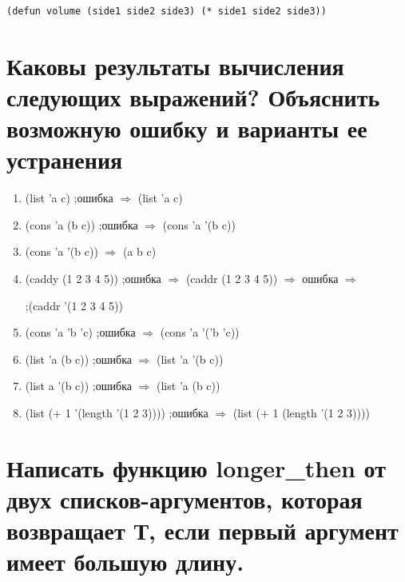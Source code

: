 \begin{lstlisting}[label=lst:task_3, caption=Задание 3.]
	(defun volume (side1 side2 side3) (* side1 side2 side3))
\end{lstlisting}

\begin{figure}[H]
\end{figure}

\section{Каковы результаты вычисления следующих выражений? Объяснить возможную ошибку и варианты ее устранения}
\begin{enumerate}
	\item (list 'a c)  ;ошибка $\Rightarrow$ (list 'a c)
	\item (cons 'a (b c)) ;ошибка $\Rightarrow$ (cons 'a '(b c))
	\item (cons 'a '(b c)) $\Rightarrow$ (a b c)
	\item (caddy (1 2 3 4 5)) ;ошибка $\Rightarrow$ (caddr (1 2 3 4 5)) $\Rightarrow$ ошибка $\Rightarrow$ 
	
	\hspace{4.5cm};(caddr '(1 2 3 4 5))
	\item (cons 'a 'b 'c)  ;ошибка $\Rightarrow$ (cons 'a '('b 'c))
	\item (list 'a (b c))  ;ошибка $\Rightarrow$ (list 'a '(b c))
	\item (list a '(b c))  ;ошибка $\Rightarrow$ (list 'a (b c))
	\item (list (+ 1 '(length '(1 2 3)))) ;ошибка $\Rightarrow$ (list (+ 1 (length '(1 2 3))))
\end{enumerate}

\section{Написать функцию longer\_then от двух списков-аргументов, которая возвращает Т, если первый аргумент имеет большую длину.}

